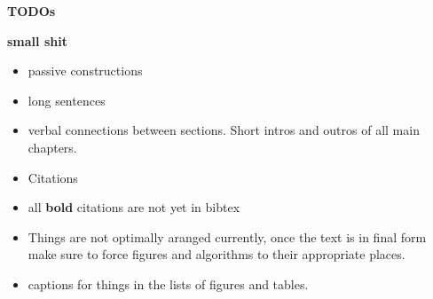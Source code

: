 \documentclass[a4paper, 12pt]{scrreprt}
\begin{document}
\textbf{TODOs}

\textbf{small shit}
\begin{itemize}
	\item passive constructions
	\item long sentences
	\item verbal connections between sections. Short intros and outros of all main chapters.
	\item Citations
	\item all \textbf{bold} citations are not yet in bibtex
	\item Things are not optimally aranged currently, once the text is in final form make sure to force figures and algorithms to their appropriate places.
	\item captions for things in the lists of figures and tables.
\end{itemize}




\pagebreak

\bigskip\bigskip

\clearpage





\printbibliography[	heading=bibintoc,			%
										title={Bibliography},
										nottype=online]
\nocite{*} %


\end{document}
